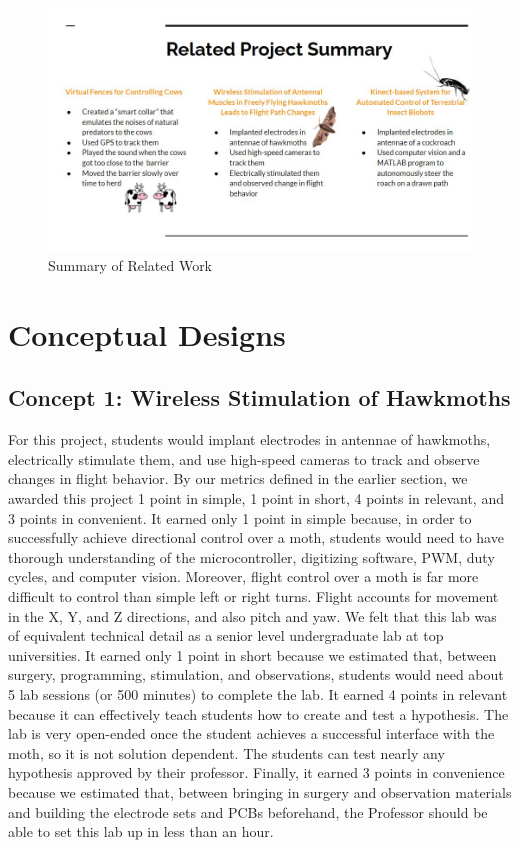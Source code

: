 \documentclass{article}
\begin{document}
\bigskip

\begin{figure}[ht!]
\centering
\includegraphics[scale=0.45]{relatedwork.JPG}
\caption{Summary of Related Work}
\label{fig:relatedwork}
\end{figure}

\section{Conceptual Designs}

\subsection{Concept 1: Wireless Stimulation of Hawkmoths}
\par For this project, students would implant electrodes in antennae of hawkmoths, electrically stimulate them, and use high-speed cameras to track and observe changes in flight behavior. By our metrics defined in the earlier section, we awarded this project 1 point in simple, 1 point in short, 4 points in relevant, and 3 points in convenient. It earned only 1 point in simple because, in order to successfully achieve directional control over a moth, students would need to have thorough understanding of the microcontroller, digitizing software, PWM, duty cycles, and computer vision. Moreover, flight control over a moth is far more difficult to control than simple left or right turns. Flight accounts for movement in the X, Y, and Z directions, and also pitch and yaw. We felt that this lab was of equivalent technical detail as a senior level undergraduate lab at top universities. It earned only 1 point in short because we estimated that, between surgery, programming, stimulation, and observations, students would need about 5 lab sessions (or 500 minutes) to complete the lab. It earned 4 points in relevant because it can effectively teach students how to create and test a hypothesis. The lab is very open-ended once the student achieves a successful interface with the moth, so it is not solution dependent. The students can test nearly any hypothesis approved by their professor. Finally, it earned 3 points in convenience because we estimated that, between bringing in surgery and observation materials and building the electrode sets and PCBs beforehand, the Professor should be able to set this lab up in less than an hour.
\end{document}
